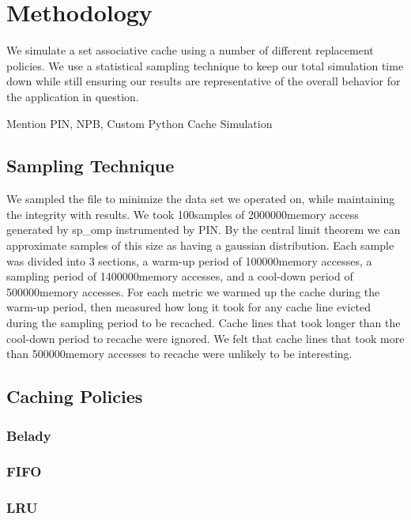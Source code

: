 \newcommand{\SAMPN}{100}
\newcommand{\SAMPK}{2000000}
\newcommand{\SAMP}{1400000}
\newcommand{\WARM}{100000}
\newcommand{\COOL}{500000}
\newcommand{\comment}[1]{}

\section{Methodology}
We simulate a set associative cache using a number of different
replacement policies.
We use a statistical sampling technique to keep our total simulation
time down while still ensuring our results are representative of the
overall behavior for the application in question.

Mention PIN, NPB, Custom Python Cache Simulation

\subsection{Sampling Technique}
We sampled the file to minimize the data set we operated on, while maintaining the integrity with results.
	We took \SAMPN samples of \SAMPK memory access generated by sp\_omp instrumented by PIN.
	By the central limit theorem we can approximate samples of this size as having a gaussian distribution.
	Each sample was divided into 3 sections, a warm-up period of \WARM memory accesses,
		a sampling period of \SAMP memory accesses, and a cool-down period of \COOL memory accesses.
	For each metric we warmed up the cache during the warm-up period,
		then measured how long it took for any cache line evicted during the sampling period to be recached.
	Cache lines that took longer than the cool-down period to recache were ignored.
	We felt that cache lines that took more than \COOL memory accesses to recache were unlikely to be interesting.

\subsection{Caching Policies}

\subsubsection{Belady}
\subsubsection{FIFO}
\subsubsection{LRU}
